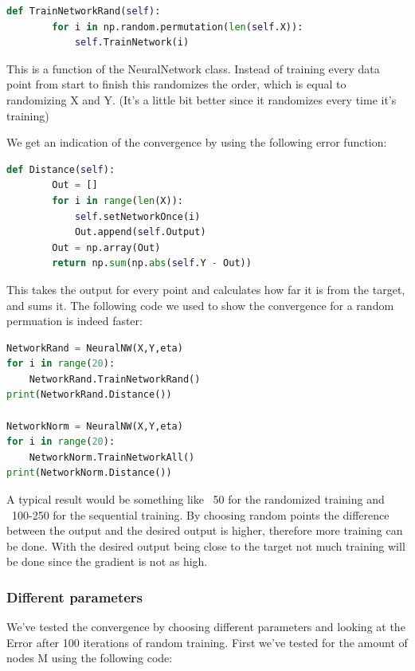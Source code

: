 \documentclass[a4paper]{article}
\begin{document}
\begin{lstlisting}[language=Python]
    def TrainNetworkRand(self):
        for i in np.random.permutation(len(self.X)):
            self.TrainNetwork(i)
\end{lstlisting}

This is a function of the NeuralNetwork class. Instead of training every data point from start to finish this randomizes the order, which is equal to randomizing X and Y. (It's a little bit better since it randomizes every time it's training)

We get an indication of the convergence by using the following error function:

\begin{lstlisting}[language=Python]
    def Distance(self):
        Out = []
        for i in range(len(X)):
            self.setNetworkOnce(i)
            Out.append(self.Output)
        Out = np.array(Out)
        return np.sum(np.abs(self.Y - Out))
\end{lstlisting}

This takes the output for every point and calculates how far it is from the target, and sums it. The following code we used to show the convergence for a random permuation is indeed faster:

\begin{lstlisting}[language=Python]
NetworkRand = NeuralNW(X,Y,eta)
for i in range(20):
    NetworkRand.TrainNetworkRand()
print(NetworkRand.Distance())

NetworkNorm = NeuralNW(X,Y,eta)
for i in range(20):
    NetworkNorm.TrainNetworkAll()
print(NetworkNorm.Distance())
\end{lstlisting}

A typical result would be something like ~50 for the randomized training and ~100-250 for the sequential training. By choosing random points the difference between the output and the desired output is higher, therefore more training can be done. With the desired output being close to the target not much training will be done since the gradient is not as high. 

\subsubsection*{Different parameters}

We've tested the convergence by choosing different parameters and looking at the Error after 100 iterations of random training.
First we've tested for the amount of nodes M using the following code:
\end{document}
